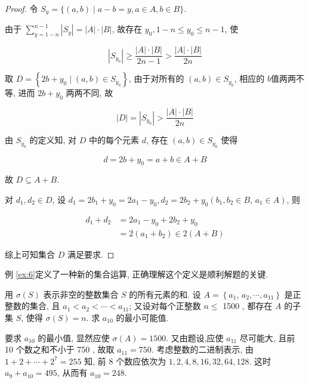 \begin{proof}
令 $S_{y}=\{(a, b) \mid a-b=y, a \in A, b \in B\}$.

由于 $\sum_{y=1-n}^{n-1}\left|S_{y}\right|=|A| \cdot|B|$, 故存在 $y_{0}, 1-n \leqslant y_{0} \leqslant n-1$, 使

$$
\left|S_{y_{0}}\right| \geqslant \frac{|A| \cdot|B|}{2 n-1}>\frac{|A| \cdot|B|}{2 n}
$$

取 $D=\left\{2 b+y_{0} \mid(a, b) \in S_{y_{0}}\right\}$, 由于对所有的 $(a, b) \in S_{y_{0}}$, 相应的 $b$值两两不等, 进而 $2 b+y_{0}$ 两两不同, 故

$$
|D|=\left|S_{y_{0}}\right|>\frac{|A| \cdot|B|}{2 n}
$$

由 $S_{y_{0}}$ 的定义知, 对 $D$ 中的每个元素 $d$, 存在 $(a, b) \in S_{y_{0}}$ 使得

$$
d=2 b+y_{0}=a+b \in A+B
$$

故 $D \subseteq A+B$.

对 $d_{1}, d_{2} \in D$, 设 $d_{1}=2 b_{1}+y_{0}=2 a_{1}-y_{0}, d_{2}=2 b_{2}+y_{0}\left(b_{1}, b_{2} \in B\right.$, $\left.a_{1} \in A\right)$, 则

$$
\begin{aligned}
d_{1}+d_{2} & =2 a_{1}-y_{0}+2 b_{2}+y_{0} \\
& =2\left(a_{1}+b_{2}\right) \in 2(A+B)
\end{aligned}
$$

综上可知集合 $D$ 满足要求.
\end{proof}

\begin{note}
例 \ref{ex:6}定义了一种新的集合运算, 正确理解这个定义是顺利解题的关键.
\end{note}

\begin{example}
用 $\sigma(S)$ 表示非空的整数集合 $S$ 的所有元素的和. 设 $A=\left\{a_{1}\right.$, $\left.a_{2}, \cdots, a_{11}\right\}$ 是正整数的集合, 且 $a_{1}<a_{2}<\cdots<a_{11}$; 又设对每个正整数 $n \leqslant$ 1500 , 都存在 $A$ 的子集 $S$, 使得 $\sigma(S)=n$. 求 $a_{10}$ 的最小可能值.
\end{example}

\begin{analysis}
要求 $a_{10}$ 的最小值, 显然应使 $\sigma(A)=1500$. 又由题设,应使 $a_{11}$ 尽可能大, 且前 10 个数之和不小于 750 , 故取 $a_{11}=750$. 考虑整数的二进制表示, 由 $1+2+\cdots+2^{7}=255$ 知, 前 8 个数应依次为 $1 ,  2 ,  4 ,  8 ,  16 ,  32 ,  64 ,  128$. 这时 $a_{9}+a_{10}=495$, 从而有 $a_{10}=248$.
\end{analysis}

